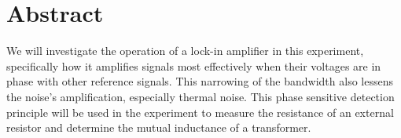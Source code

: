 \section{Abstract}
	We will investigate the operation of a lock-in amplifier in this experiment, specifically how it amplifies signals most effectively when their voltages are in phase with other reference signals. This narrowing of the bandwidth also lessens the noise's amplification, especially thermal noise. This phase sensitive detection principle will be used in the experiment to measure the resistance of an external resistor and determine the mutual inductance of a transformer.